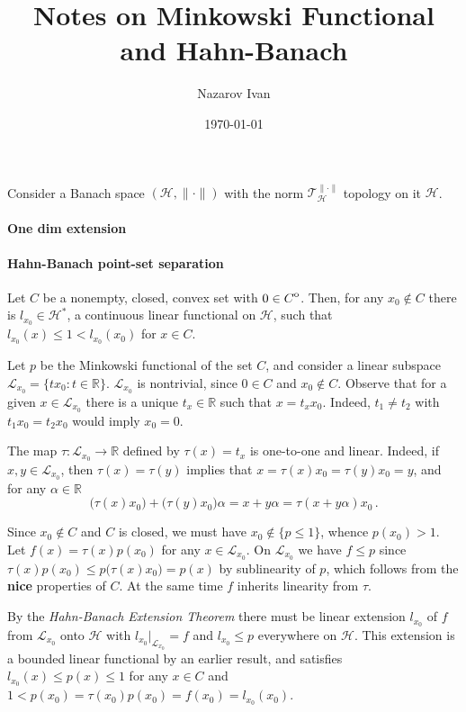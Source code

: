 \documentclass[a4paper]{article}
\title{Notes on Minkowski Functional and Hahn-Banach}
\author{Nazarov Ivan}
\date{\today}
\newcommand{\Hcal}{\mathcal{H}}
\newcommand{\real}{\mathbb{R}}
\newcommand{\interior}[1]{%
  {\kern0pt#1}^{\mathrm{o}}%
}
\newcommand{\Tcal}{\mathcal{T}}
\newcommand{\Lcal}{\mathcal{L}}
\begin{document}
\maketitle

Consider a Banach space $(\Hcal, \|\cdot\|)$ with the norm $\Tcal^{\|\cdot\|}_\Hcal$
topology on it $\Hcal$.

\paragraph{One dim extension} %
\label{par:one_dim_extension}




\paragraph{Hahn-Banach point-set separation} %
\label{par:hahn_banach_point_set_separation}

Let $C$ be a nonempty, closed, convex set with $0\in \interior{C}$. Then, for any
$x_0\notin C$ there is $l_{x_0} \in \Hcal^*$, a continuous linear functional on
$\Hcal$, such that $l_{x_0}(x) \leq 1 < l_{x_0}(x_0)$ for $x\in C$.

Let $p$ be the Minkowski functional of the set $C$, and consider a linear subspace
$\Lcal_{x_0} = \{t x_0\colon t\in \real\}$. $\Lcal_{x_0}$ is nontrivial, since $0\in C$
and $x_0\notin C$. Observe that for a given $x\in \Lcal_{x_0}$ there is a unique
$t_x \in \real$ such that $x = t_x x_0$. Indeed, $t_1\neq t_2$ with $t_1 x_0 = t_2 x_0$
would imply $x_0 = 0$.

The map $\tau\colon \Lcal_{x_0} \to \real$ defined by $\tau(x) = t_x$ is one-to-one
and linear. Indeed, if $x, y\in \Lcal_{x_0}$, then $\tau(x) = \tau(y)$ implies that
$x = \tau(x) x_0 = \tau(y) x_0 = y$, and for any $\alpha\in \real$
\begin{equation}
  \bigl( \tau(x) x_0 \bigr) + \bigl( \tau(y) x_0 \bigr) \alpha
    = x + y \alpha
    = \tau(x + y \alpha) x_0
  \,.
\end{equation}

Since $x_0 \notin C$ and $C$ is closed, we must have $x_0\notin \{p\leq 1\}$, whence
$p(x_0) > 1$. Let $f(x) = \tau(x) p(x_0)$ for any $x \in \Lcal_{x_0}$. On $\Lcal_{x_0}$
we have $f\leq p$ since $\tau(x) p(x_0) \leq p\bigl(\tau(x) x_0\bigr) = p(x)$ by
sublinearity of $p$, which follows from the {\bf nice} properties of $C$. At the same
time $f$ inherits linearity from $\tau$.

By the {\it Hahn-Banach Extension Theorem} there must be linear extension $l_{x_0}$
of $f$ from $\Lcal_{x_0}$ onto $\Hcal$ with $l_{x_0}\big\vert_{\Lcal_{x_0}} = f$ and
$l_{x_0} \leq p$ everywhere on $\Hcal$. This extension is a bounded linear functional
by an earlier result, and satisfies $l_{x_0}(x) \leq p(x) \leq 1$ for any $x\in C$
and $1 < p(x_0) = \tau(x_0) p(x_0) = f(x_0) = l_{x_0}(x_0)$.

\end{document}
